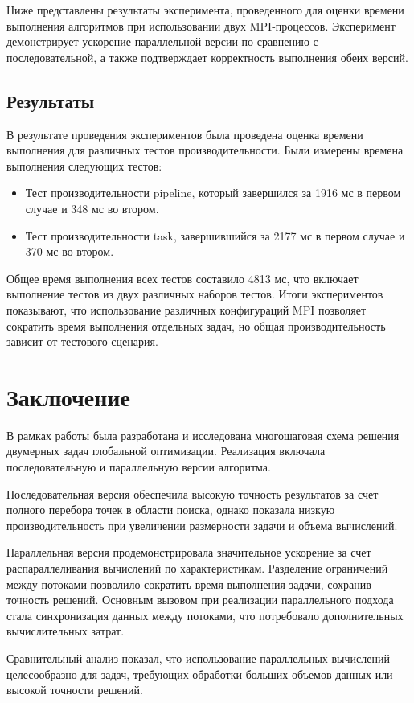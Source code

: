 \documentclass[a4paper,12pt]{article}
\begin{document}
Ниже представлены результаты эксперимента, проведенного для оценки времени выполнения алгоритмов при использовании двух MPI-процессов. Эксперимент демонстрирует ускорение параллельной версии по сравнению с последовательной, а также подтверждает корректность выполнения обеих версий.
\subsection*{Результаты}
В результате проведения экспериментов была проведена оценка времени выполнения для различных тестов производительности. Были измерены времена выполнения следующих тестов:
\begin{itemize}
    \item Тест производительности pipeline, который завершился за 1916 мс в первом случае и 348 мс во втором.
    \item Тест производительности task, завершившийся за 2177 мс в первом случае и 370 мс во втором.
\end{itemize}
Общее время выполнения всех тестов составило 4813 мс, что включает выполнение тестов из двух различных наборов тестов. Итоги экспериментов показывают, что использование различных конфигураций MPI позволяет сократить время выполнения отдельных задач, но общая производительность зависит от тестового сценария.
\newpage
\section*{Заключение}
В рамках работы была разработана и исследована многошаговая схема решения двумерных задач глобальной оптимизации. Реализация включала последовательную и параллельную версии алгоритма.

Последовательная версия обеспечила высокую точность результатов за счет полного перебора точек в области поиска, однако показала низкую производительность при увеличении размерности задачи и объема вычислений.

Параллельная версия продемонстрировала значительное ускорение за счет распараллеливания вычислений по характеристикам. Разделение ограничений между потоками позволило сократить время выполнения задачи, сохранив точность решений. Основным вызовом при реализации параллельного подхода стала синхронизация данных между потоками, что потребовало дополнительных вычислительных затрат.

Сравнительный анализ показал, что использование параллельных вычислений целесообразно для задач, требующих обработки больших объемов данных или высокой точности решений.
\end{document}
